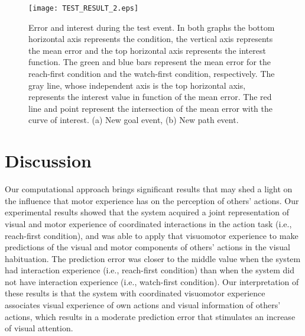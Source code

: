 \documentclass[conference]{IEEEtran}
\begin{document}
\begin{figure}
\centering
\texttt{[image: TEST\_RESULT\_2.eps]}
\caption{Error and interest during the test event. In both graphs the bottom horizontal axis represents the condition, the vertical axis represents the mean error and the top horizontal axis represents the interest function. The green and blue bars represent the mean error for the reach-first condition and the watch-first condition, respectively. The gray line, whose independent axis is the top horizontal axis, represents the interest value in function of the mean error. The red line and point represent the intersection of the mean error with the curve of interest. (a) New goal event, (b) New path event.}
\label{figure7}
\end{figure}

\section{Discussion}
Our computational approach brings significant results that may shed a light on the influence that motor experience has on the perception of others' actions. Our experimental results showed that the system acquired a joint representation of visual and motor experience of coordinated interactions  in the action task (i.e., reach-first condition), and was able to apply that visuomotor experience to make predictions of the visual and motor components of others' actions in the visual habituation. The prediction error was closer to the middle value when the system had interaction experience (i.e., reach-first condition) than when the system did not have interaction experience (i.e., watch-first condition). Our interpretation of these results is that the system with coordinated visuomotor experience associates visual experience of own actions and visual information of others' actions, which results in a moderate prediction error that stimulates an increase of visual attention.
\end{document}

